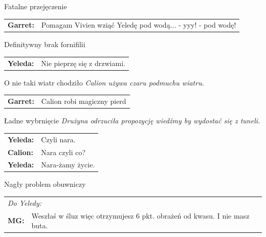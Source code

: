 \documentclass[10pt,twoside,twocolumn]{book}
\begin{document}
\begin{rpg-quotebox}{Fatalne przejęczenie}
   \begin{tabularx}{\columnwidth}{lX}
      \textbf{Garret:} & Pomagam Vivien wziąć Yeledę pod wodą... - yyy! - pod wodę!\\
   \end{tabularx}
\end{rpg-quotebox}


\begin{rpg-quotebox}{Definitywny brak fornifilii}
   \begin{tabularx}{\columnwidth}{lX}
      \textbf{Yeleda:} & Nie pieprzę się z drzwiami.\\
   \end{tabularx}
\end{rpg-quotebox}


\begin{rpg-quotebox}{O nie taki wiatr chodziło}
   \textit{Calion używa czaru podmuchu wiatru. }\\
   \newline
   \begin{tabularx}{\columnwidth}{lX}
      \textbf{Garret:} & Calion robi magiczny pierd\\
   \end{tabularx}
\end{rpg-quotebox}


\begin{rpg-quotebox}{Ładne wybrnięcie}
   \textit{Drużyna odrzuciła propozycję wiedźmy by wydostać się z tuneli.}\\
   
   \begin{tabularx}{\columnwidth}{lX}
      \textbf{Yeleda:} & Czyli nara.\\
      \textbf{Calion:} & Nara czyli co?\\
      \textbf{Yeleda:} & Nara-żamy życie.\\
   \end{tabularx}
\end{rpg-quotebox}


\begin{rpg-quotebox}{Nagły problem obuwniczy}
   \begin{tabularx}{\columnwidth}{lX}
      \multicolumn{2}{l}{\textit{Do Yeledy:}}\\
      
      \textbf{MG:} & Weszłaś w śluz więc otrzymujesz 6 pkt. obrażeń od kwasu. I nie masz buta.\\
   \end{tabularx}
\end{rpg-quotebox}
\end{document}
